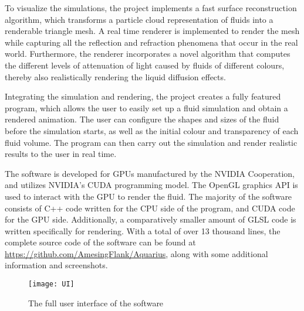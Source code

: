 To visualize the simulations, the project implements a fast surface reconstruction algorithm, which transforms a particle cloud representation of fluids into a renderable triangle mesh. A real time renderer is implemented to render the mesh while capturing all the reflection and refraction phenomena that occur in the real world. Furthermore, the renderer incorporates a novel algorithm that computes the different levels of attenuation of light caused by fluids of different colours, thereby also realistically rendering the liquid diffusion effects. 

Integrating the simulation and rendering, the project creates a fully featured program, which allows the user to easily set up a fluid simulation and obtain a rendered animation. The user can configure the shapes and sizes of the fluid before the simulation starts, as well as the initial colour and transparency of each fluid volume. The program can then carry out the simulation and render realistic results to the user in real time. 

The software is developed for GPUs manufactured by the NVIDIA Cooperation, and utilizes NVIDIA's CUDA programming model. The OpenGL graphics API is used to interact with the GPU to render the fluid. The majority of the software consists of C++ code written for the CPU side of the program, and CUDA code for the GPU side. Additionally, a comparatively smaller amount of GLSL code is written specifically for rendering. With a total of over 13 thousand lines, the complete source code of the software can be found at \url{https://github.com/AmesingFlank/Aquarius}, along with some additional information and screenshots.

\begin{figure}[H]
    \centering
        \texttt{[image: UI]}
    \caption{The full user interface of the software}
    \label{figure UI demo}
\end{figure}